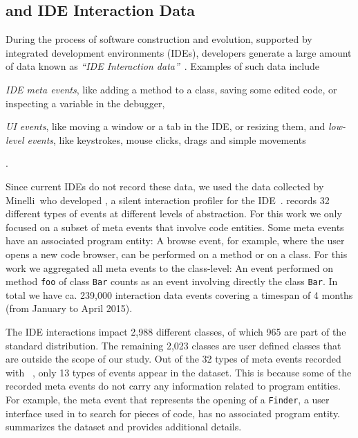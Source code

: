 \subsection{\dfl and IDE Interaction Data}\label{sub:interaction}

During the process of software construction and evolution, supported by integrated development environments (IDEs), developers generate a large amount of data known as \emph{``IDE Interaction data''}~\cite{Kers2005, Murp2006}.
Examples of such data include \begin{inparaenum}[i)] \item \emph{IDE meta events}, like adding a method to a class, saving some edited code, or inspecting a variable in the debugger, \item \emph{UI events}, like moving a window or a tab in the IDE, or resizing them, and \emph{low-level events}, like keystrokes, mouse clicks, drags and simple movements\end{inparaenum}.

Since current IDEs do not record these data, we used the data collected by Minelli~\etal who developed \dfl, a silent interaction profiler for the \pha IDE~\cite{Mine2015b}.
\dfl records 32 different types of events at different levels of abstraction.
For this work we only focused on a subset of meta events that involve code entities.
Some meta events have an associated program entity: A browse event, for example, where the user opens a new code browser, can be performed on a method or on a class.
For this work we aggregated all meta events to the class-level: An event performed on method \texttt{foo} of class \texttt{Bar} counts as an event involving directly the class \texttt{Bar}.
In total we have ca.
239,000 interaction data events covering a timespan of 4 months (\ie from January to April 2015).

The IDE interactions impact 2,988 different classes, of which 965 are part of the standard \pha distribution.
The remaining 2,023 classes are user defined classes that are outside the scope of our study.
Out of the 32 types of meta events recorded with \dfl~\cite{Mine2015b}, only 13 types of events appear in the dataset.
This is because some of the recorded meta events do not carry any information related to program entities.
For example, the meta event that represents the opening of a \texttt{Finder}, a user interface used in \pha to search for pieces of code, has no associated program entity.
 summarizes the dataset and provides additional details.

